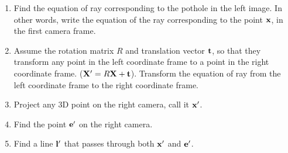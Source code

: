 \documentclass[times,singlecolumn]{article}
\begin{document}
\begin{enumerate}
\item Find the equation of ray corresponding to the pothole in the left image.
  In other words, write the equation of the ray corresponding to the point
  $\mathbf{x}$, in the first camera frame.
  \vspace{8em}

\item Assume the rotation matrix $R$ and translation vector $\mathbf{t}$, so
  that they transform any point in the left coordinate frame to a point in the
  right coordinate frame. ($\mathbf{X}' = R \mathbf{X}+ \mathbf{t}$). Transform the equation of
  ray from the left coordinate frame to the right coordinate frame.
  \vspace{8em}

\item Project any 3D point on the  right camera, call it $\mathbf{x}'$.
  \vspace{8em}

\item Find the point $\mathbf{e}'$ on the right camera.
  \vspace{8em}

\item Find a line $\mathbf{l}'$ that passes through both $\mathbf{x}'$ and $\mathbf{e}'$.
  \vspace{8em}

\end{enumerate}
\end{document}
